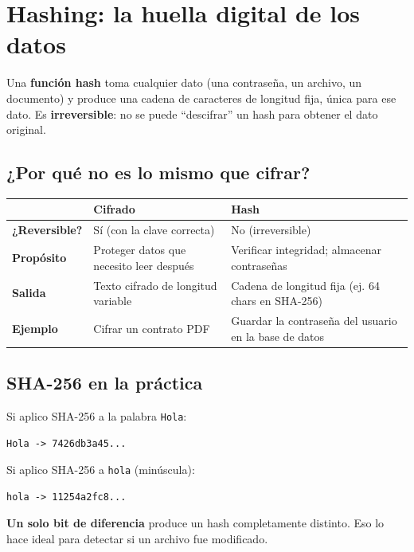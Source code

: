 \documentclass[12pt,a4paper]{article}
\renewcommand{\arraystretch}{1.25}
\begin{document}
\newpage
\section{Hashing: la huella digital de los datos}

\begin{cajaDefinicion}
Una \textbf{función hash} toma cualquier dato (una contrase\~na, un archivo, un documento) y produce una cadena de caracteres de longitud fija, \'unica para ese dato. Es \textbf{irreversible}: no se puede ``descifrar'' un hash para obtener el dato original.
\end{cajaDefinicion}

\subsection{¿Por qu\'e no es lo mismo que cifrar?}

\renewcommand{\arraystretch}{1.5}
\begin{tabularx}{\textwidth}{|>{\bfseries}p{2.5cm}|X|X|}
\hline
 & \textbf{Cifrado} & \textbf{Hash} \\
\hline
¿Reversible? & S\'i (con la clave correcta) & No (irreversible) \\
\hline
Prop\'osito & Proteger datos que necesito leer despu\'es & Verificar integridad; almacenar contrase\~nas \\
\hline
Salida & Texto cifrado de longitud variable & Cadena de longitud fija (ej. 64 chars en SHA-256) \\
\hline
Ejemplo & Cifrar un contrato PDF & Guardar la contrase\~na del usuario en la base de datos \\
\hline
\end{tabularx}

\subsection{SHA-256 en la pr\'actica}

\begin{cajaEjemplo}
Si aplico SHA-256 a la palabra \texttt{Hola}:
\begin{verbatim}
Hola -> 7426db3a45...
\end{verbatim}
Si aplico SHA-256 a \texttt{hola} (min\'uscula):
\begin{verbatim}
hola -> 11254a2fc8...
\end{verbatim}
\textbf{Un solo bit de diferencia} produce un hash completamente distinto. Eso lo hace ideal para detectar si un archivo fue modificado.
\end{cajaEjemplo}
\end{document}
